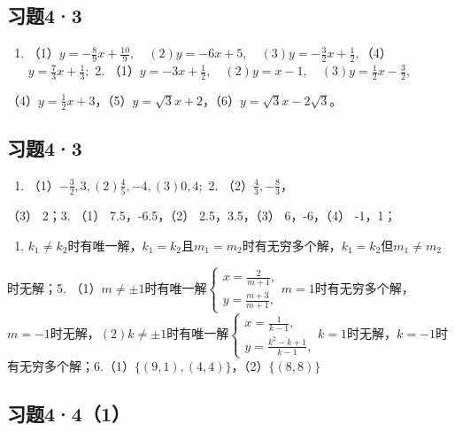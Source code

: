 \subsection{习题4·3}

\begin{enumerate}
\item
  （1）\(y = -\frac{8}{9} x + \frac{10}{9}, \quad (2)y = -6x + 5, \quad (3)y = -\frac{3}{2} x + \frac{1}{2},\)（4）\(y = \frac{7}{3} x + \frac{1}{3};\)
  2.
  （1）\(y = -3x + \frac{1}{2}, \quad (2)y = x - 1, \quad (3)y = \frac{1}{2} x - \frac{3}{2},\)
\end{enumerate}

（4）\(y = \frac{1}{2} x + 3\)，（5）\(y = \sqrt{3} x + 2\)，（6）\(y = \sqrt{3} x - 2\sqrt{3}\)。

\subsection{习题4·3}

\begin{enumerate}
\item
  （1）\(-\frac{3}{2}, 3, (2) \frac{4}{5}, -4, (3) 0, 4;\) 2.
  （2）\(\frac{4}{3}, -\frac{8}{3}\)，
\end{enumerate}

（3） 2；3. （1） 7.5，-6.5，（2） 2.5，3.5，（3） 6，-6，（4） -1，1；

\begin{enumerate}[start=4]
\item
  \(k_{1} \neq k_{2}\)时有唯一解，\(k_{1} = k_{2}\)且\(m_{1} = m_{2}\)时有无穷多个解，\(k_{1} = k_{2}\)但\(m_{1} \neq m_{2}\)
\end{enumerate}
时无解；5.
（1）\(m \neq \pm 1\)时有唯一解\(\left\{ \begin{array}{l} x = \frac{2}{m + 1}, \\ y = \frac{m + 3}{m + 1}, \end{array} \right.\)\(m = 1\)时有无穷多个解，\(m = -1\)时无解，\((2)k\neq \pm 1\)时有唯一解\(\left\{ \begin{array}{l}x = \frac{1}{k - 1},\\ y = \frac{k^2 - k + 1}{k - 1}, \end{array} \right.\)\(k = 1\)时无解，\(k\)\(= -1\)时有无穷多个解；6.（1）\(\{(9,1),(4,4)\}\)，（2）\(\{(8,8)\}\)

\subsection{习题4·4（1）}

